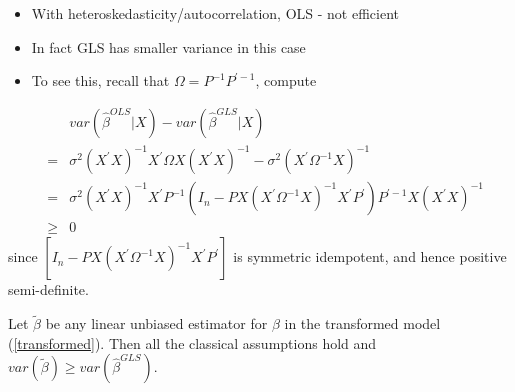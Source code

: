 \documentclass[notes=show]{beamer}
\begin{document}
\begin{frame}%


\begin{itemize}
\item With heteroskedasticity/autocorrelation, OLS - not efficient

\item In fact GLS has smaller variance in this case

\item To see this, recall that $\Omega =P^{-1}P^{\prime -1}$, compute
\end{itemize}

\newline
\begin{eqnarray*}
&&var(\widehat{\beta }^{OLS}|X)-var(\widehat{\beta }^{GLS}|X) \\
&=&\sigma ^{2}\left( X^{\prime }X\right) ^{-1}X^{\prime }\Omega X\left(
X^{\prime }X\right) ^{-1}-\sigma ^{2}\left( X^{\prime }\Omega ^{-1}X\right)
^{-1} \\
&=&\sigma ^{2}\left( X^{\prime }X\right) ^{-1}X^{\prime
}P^{-1}(I_{n}-PX\left( X^{\prime }\Omega ^{-1}X\right) ^{-1}X^{\prime
}P^{\prime })P^{\prime -1}X\left( X^{\prime }X\right) ^{-1} \\
&\geq &0
\end{eqnarray*}%
since $\left[ I_{n}-PX\left( X^{\prime }\Omega ^{-1}X\right) ^{-1}X^{\prime
}P^{\prime }\right] $ is symmetric idempotent, and hence positive
semi-definite.

\end{frame}%

\begin{frame}%


\begin{theorem}
Let $\widetilde{\beta }$ be any linear unbiased estimator for $\beta $ in
the transformed model (\ref{transformed}). Then all the classical
assumptions hold and $var(\widetilde{\beta })\geq var(\widehat{\beta }%
^{GLS}).$
\end{theorem}

\end{frame}%
\end{document}
